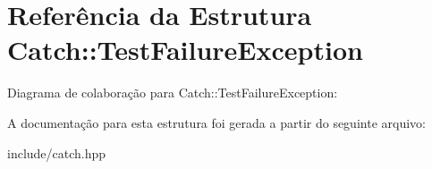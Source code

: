 \hypertarget{structCatch_1_1TestFailureException}{}\section{Referência da Estrutura Catch\+:\+:Test\+Failure\+Exception}
\label{structCatch_1_1TestFailureException}


Diagrama de colaboração para Catch\+:\+:Test\+Failure\+Exception\+:


A documentação para esta estrutura foi gerada a partir do seguinte arquivo\+:\begin{DoxyCompactItemize}
\item 
include/catch.\+hpp\end{DoxyCompactItemize}
